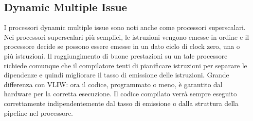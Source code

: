 \documentclass[12pt,a4paper]{article}
\begin{document}
\subsection{Dynamic Multiple Issue}
I processori dynamic multiple issue sono noti anche come processori superscalari. Nei processori superscalari più semplici, le istruzioni vengono emesse in ordine e il processore decide se possono essere emesse in un dato ciclo di clock zero, una o più istruzioni. Il raggiungimento di buone prestazioni su un tale processore richiede comunque che il compilatore tenti di pianificare
istruzioni per separare le dipendenze e quindi migliorare il tasso di emissione delle istruzioni. Grande differenza con VLIW: ora il codice, programmato o meno, è garantito dal hardware per la corretta esecuzione. Il codice compilato verrà sempre eseguito correttamente indipendentemente dal tasso di emissione o dalla struttura della pipeline nel processore.
\end{document}
